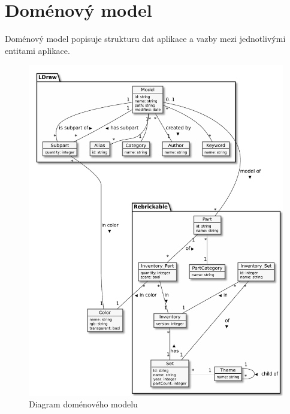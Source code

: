\section{Doménový model}
Doménový model popisuje strukturu dat aplikace a vazby mezi jednotlivými entitami aplikace. 


 \begin{figure}[htbp]
    \centering
    \includegraphics[width=\textwidth,height=\textheight,keepaspectratio]{pdfs/diagram}
    \caption{Diagram doménového modelu\label{diagram-domenovy}}
  \end{figure}

